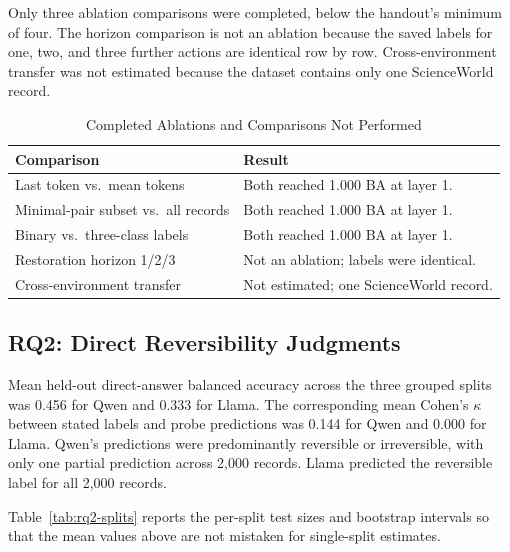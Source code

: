 \documentclass[conference]{IEEEtran}
\begin{document}
Only three ablation comparisons were completed, below the handout's minimum of
four. The horizon comparison is not an ablation because the saved labels for
one, two, and three further actions are identical row by row.
Cross-environment transfer was not estimated because the dataset contains only
one ScienceWorld record.

\begin{table}[t]
\caption{Completed Ablations and Comparisons Not Performed}
\label{tab:ablations}
\centering
\small
\begin{tabular}{p{}p{}}
\toprule
Comparison & Result \\
\midrule
Last token vs.\ mean tokens & Both reached 1.000 BA at layer 1. \\
Minimal-pair subset vs.\ all records & Both reached 1.000 BA at layer 1. \\
Binary vs.\ three-class labels & Both reached 1.000 BA at layer 1. \\
Restoration horizon 1/2/3 & Not an ablation; labels were identical. \\
Cross-environment transfer & Not estimated; one ScienceWorld record. \\
\bottomrule
\end{tabular}
\end{table}

\subsection{RQ2: Direct Reversibility Judgments}

Mean held-out direct-answer balanced accuracy across the three grouped
splits was 0.456 for Qwen and 0.333 for Llama. The corresponding mean
Cohen's $\kappa$ between stated labels and probe predictions was 0.144
for Qwen and 0.000 for Llama. Qwen's predictions were predominantly
reversible or irreversible, with only one partial prediction across
2,000 records. Llama predicted the reversible label for all 2,000
records.

Table~\ref{tab:rq2-splits} reports the per-split test sizes and bootstrap
intervals so that the mean values above are not mistaken for
single-split estimates.
\end{document}
